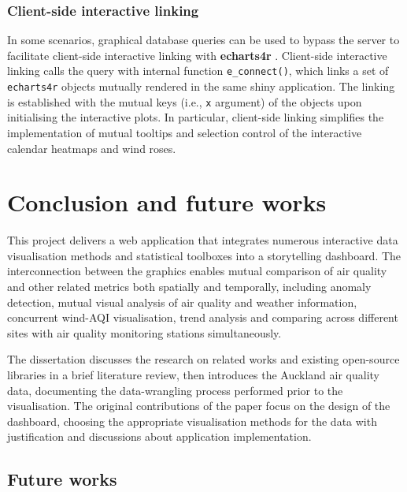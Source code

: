 \documentclass{aucklandthesis}
\begin{document}
\hypertarget{client-side-interactive-linking}{%
\subsection{Client-side interactive linking}\label{client-side-interactive-linking}}

In some scenarios, graphical database queries can be used to bypass the server to facilitate client-side interactive linking with \textbf{echarts4r} \autocite{echarts4r}. Client-side interactive linking calls the query with internal function \texttt{e\_connect()}, which links a set of \texttt{echarts4r} objects mutually rendered in the same shiny application. The linking is established with the mutual keys (i.e., \texttt{x} argument) of the objects upon initialising the interactive plots. In particular, client-side linking simplifies the implementation of mutual tooltips and selection control of the interactive calendar heatmaps and wind roses.

\hypertarget{ch:conclusion}{%
\chapter{Conclusion and future works}\label{ch:conclusion}}

This project delivers a web application that integrates numerous interactive data visualisation methods and statistical toolboxes into a storytelling dashboard. The interconnection between the graphics enables mutual comparison of air quality and other related metrics both spatially and temporally, including anomaly detection, mutual visual analysis of air quality and weather information, concurrent wind-AQI visualisation, trend analysis and comparing across different sites with air quality monitoring stations simultaneously.

The dissertation discusses the research on related works and existing open-source libraries in a brief literature review, then introduces the Auckland air quality data, documenting the data-wrangling process performed prior to the visualisation. The original contributions of the paper focus on the design of the dashboard, choosing the appropriate visualisation methods for the data with justification and discussions about application implementation.

\hypertarget{future-works}{%
\section{Future works}\label{future-works}}
\end{document}
